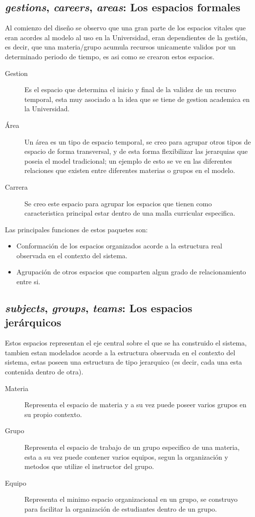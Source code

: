 \subsection{\emph{gestions}, \emph{careers}, \emph{areas}: Los espacios
formales}
Al comienzo del diseño se observo que una gran parte de los espacios vitales que
eran acordes al modelo al uso en la Universidad, eran dependientes de la
gestión, es decir, que una materia/grupo acumula recursos unicamente validos por
un determinado periodo de tiempo, es asi como se crearon estos espacios.

\begin{description}
\item [Gestion] Es el espacio que determina el inicio y final de la validez de
un recurso temporal, esta muy asociado a la idea que se tiene de gestion
academica en la Universidad.
\item [Área] Un área es un tipo de espacio temporal, se creo para agrupar otros
tipos de espacio de forma transversal, y de esta forma flexibilizar las
jerarquias que poseia el model tradicional; un ejemplo de esto se ve en las
diferentes relaciones que existen entre diferentes materias o grupos en el
modelo.
\item [Carrera] Se creo este espacio para agrupar los espacios que tienen como
caracteristica principal estar dentro de una malla curricular especifica.
\end{description}

Las principales funciones de estos paquetes son:

\begin{itemize}
\item Conformación de los espacios organizados acorde a la estructura real
observada en el contexto del sistema.
\item Agrupación de otros espacios que comparten algun grado de relacionamiento
entre si.
\end{itemize}

\subsection{\emph{subjects}, \emph{groups}, \emph{teams}: Los espacios
jerárquicos}
Estos espacios representan el eje central sobre el que se ha construido el
sistema, tambien estan modelados acorde a la estructura observada en el contexto
del sistema, estas poseen una estructura de tipo jerarquico (es decir, cada una
esta contenida dentro de otra).

\begin{description}
\item [Materia] Representa el espacio de materia y a su vez puede poseer varios
grupos en su propio contexto.
\item [Grupo] Representa el espacio de trabajo de un grupo especifico de una
materia, esta a su vez puede contener varios equipos, segun la organización y
metodos que utilize el instructor del grupo.
\item [Equipo] Representa el minimo espacio organizacional en un grupo, se
construyo para facilitar la organización de estudiantes dentro de un grupo.
\end{description}

